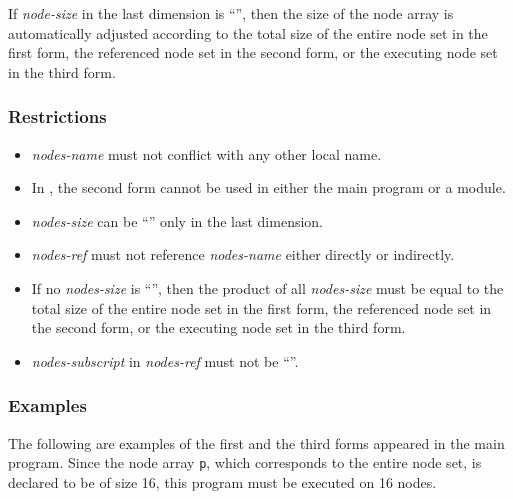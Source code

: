 If {\it node-size} in the last dimension is ``{\tt *}'', then the size
of the node array is automatically adjusted according to the total size
of the entire node set in the first form, the referenced node set in the
second form, or the executing node set in the third form.

\subsubsection*{Restrictions}

\begin{itemize}
\item {\it nodes-name} must not conflict with any other local name.
\item In {\Fort}, the second form cannot be used in either the main
      program or a module.
\item {\it nodes-size} can be ``{\tt *}'' only in the last dimension.
\item {\it nodes-ref} must not reference {\it nodes-name} either
      directly or indirectly.
\item If no {\it nodes-size} is ``{\tt *}'', then the product
      of all {\it nodes-size} must be equal to the total size of the
      entire node set in the first form, the referenced node set in the
      second form, or the executing node set in the third form.
%
\item {\it nodes-subscript} in {\it nodes-ref} must not be ``{\tt *}''.
\end{itemize}

\subsubsection*{Examples}

The following are examples of the first and the third forms appeared in
the main program. Since the node array {\tt p}, which corresponds to the
entire node set, is declared to be of size 16, this program must be
executed on 16 nodes.


